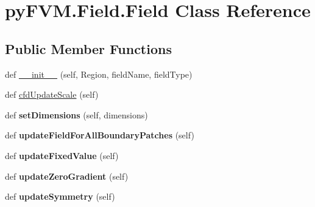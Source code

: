 \hypertarget{classpy_f_v_m_1_1_field_1_1_field}{}\section{py\+F\+V\+M.\+Field.\+Field Class Reference}
\label{classpy_f_v_m_1_1_field_1_1_field}
\subsection*{Public Member Functions}
\begin{DoxyCompactItemize}
\item 
def \mbox{\hyperlink{classpy_f_v_m_1_1_field_1_1_field_a16d21209c4df20b4e5350d8dcca9a654}{\+\_\+\+\_\+init\+\_\+\+\_\+}} (self, Region, field\+Name, field\+Type)
\item 
def \mbox{\hyperlink{classpy_f_v_m_1_1_field_1_1_field_a28b389b43c708f061166753dd23c395e}{cfd\+Update\+Scale}} (self)
\item 
\mbox{\label{classpy_f_v_m_1_1_field_1_1_field_ab14f7585afe64543157f37e429cb926a}} 
def {\bfseries set\+Dimensions} (self, dimensions)
\item 
\mbox{\label{classpy_f_v_m_1_1_field_1_1_field_adf49a03aab9252d5a155cbef63627c50}} 
def {\bfseries update\+Field\+For\+All\+Boundary\+Patches} (self)
\item 
\mbox{\label{classpy_f_v_m_1_1_field_1_1_field_a8a5f627f7cbbd0b65a2be1b01748b630}} 
def {\bfseries update\+Fixed\+Value} (self)
\item 
\mbox{\label{classpy_f_v_m_1_1_field_1_1_field_abf97bcd6466bce4a30d0618222bb87d5}} 
def {\bfseries update\+Zero\+Gradient} (self)
\item 
\mbox{\label{classpy_f_v_m_1_1_field_1_1_field_a75f70f91d99205417935e266d882a7a1}} 
def {\bfseries update\+Symmetry} (self)
\end{DoxyCompactItemize}
